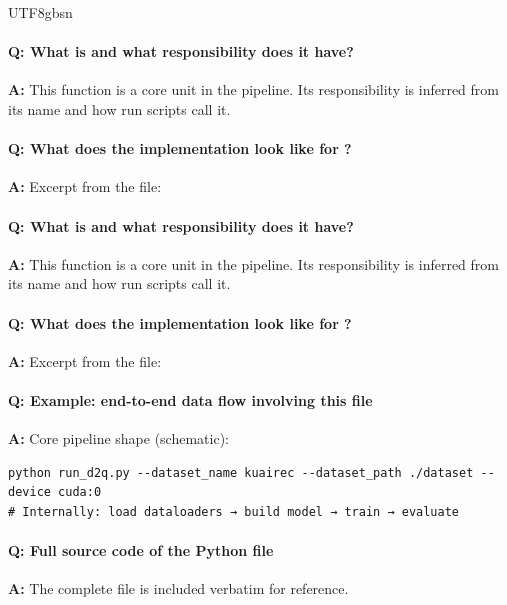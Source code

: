 \documentclass[11pt]{article}
\begin{document}
\begin{CJK*}{UTF8}{gbsn}
\vspace{1mm}


\paragraph{Q: What is \texttt{} and what responsibility does it have?}
\textbf{A:} This function is a core unit in the pipeline. Its responsibility is inferred from its name and how run scripts call it.

\paragraph{Q: What does the implementation look like for \texttt{}?}
\textbf{A:} Excerpt from the file:

\vspace{1mm}


\paragraph{Q: What is \texttt{} and what responsibility does it have?}
\textbf{A:} This function is a core unit in the pipeline. Its responsibility is inferred from its name and how run scripts call it.

\paragraph{Q: What does the implementation look like for \texttt{}?}
\textbf{A:} Excerpt from the file:

\vspace{1mm}


\paragraph{Q: Example: end-to-end data flow involving this file}
\textbf{A:} Core pipeline shape (schematic):

\begin{Verbatim}[fontsize=\small]
python run_d2q.py --dataset_name kuairec --dataset_path ./dataset --device cuda:0
# Internally: load dataloaders → build model → train → evaluate
\end{Verbatim}

\paragraph{Q: Full source code of the Python file}
\textbf{A:} The complete file is included verbatim for reference.


\end{CJK*}
\end{document}
